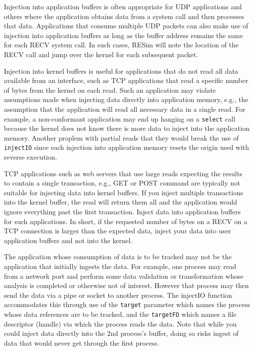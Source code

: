 \documentclass[titlepage]{article}
\begin{document}
Injection into application buffers is often appropriate for UDP applications and others where the application obtains data from a system 
call and then processes that data.  Applications that consume multiple UDP packets can also make use of injection into application buffers
as long as the buffer address remains the same for each RECV system call.  In such cases, RESim will note the location of the RECV call
and jump over the kernel for each subsequent packet.
 
Injection into kernel buffers is useful for applications that do not read all data available from an interface, such as TCP applications that read a 
specific number of bytes from the kernel on each read.  
Such an application may violate assumptions made when injecting data directly into application memory, e.g., the assumption that the application
will read all necessary data in a single read.  For example, a non-conformant application may end up hanging on a {\tt select} call because
the kernel does not know there is more data to inject into the application memory.  Another proplem with partial reads that they would break
the use of {\tt injectIO} since each injection into application memory resets the origin used with reverse execution.

TCP applications such as web servers that use large reads expecting the results to contain a single transaction, e.g., GET or POST command are typically
not suitable for injecting data into kernel buffers.  If you inject multiple transactions into the kernel buffer, the read will return them all and the
application would ignore everything past the first transaction.  Inject data into application buffers for such applications.
In short, if the requested number of bytes on a RECV on a TCP connection is larger than the expected data, inject your data into user application buffers
and not into the kernel.

The application whose consumption of data is to be tracked may not be the application that initially ingests the data.  For example, one
process may read from a network port and perform some data validation or transformation whose analysis is completed or otherwise not of interest.
However that process may then send the data via a pipe or socket to another process.  The injectIO function accommodates this through use of
the {\tt target} parameter which names the process whose data references are to be tracked, and the {\tt targetFD} which names 
a file descriptor (handle) via which
the process reads the data.  Note that while you could inject data directly into the 2nd process's buffer, doing so risks ingest of data that
would never get through the first process.
\end{document}
